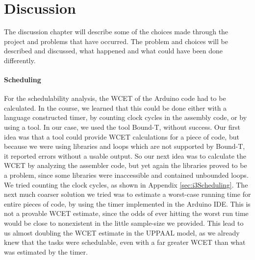 \chapter{Discussion}
\label{chap:Discussion}
The discussion chapter will describe some of the choices made through the project and problems that have occurred. The problem and choices will be described and discussed, what happened and what could have been done differently. 


\subsubsection{Scheduling}
For the schedulability analysis, the WCET of the Arduino code had to be calculated. In the course, we learned that this could be done either with a language constructed timer, by counting clock cycles in the assembly code, or by using a tool. In our case, we used the tool Bound-T, without success. Our first idea was that a tool could provide WCET calculations for a piece of code, but because we were using libraries and loops which are not supported by Bound-T, it reported errors without a usable output. So our next idea was to calculate the WCET by analyzing the assembler code, but yet again the libraries proved to be a problem, since some libraries were inaccessible and contained unbounded loops. We tried counting the clock cycles, as shown in Appendix \ref{sec:i3Scheduling}. The next much coarser solution we tried was to estimate a worst-case running time for entire pieces of code, by using the timer implemented in the Arduino IDE. This is not a provable WCET estimate, since the odds of ever hitting the worst run time would be close to nonexistent in the little sample-size we provided. This lead to us almost doubling the WCET estimate in the UPPAAL model, as we already knew that the tasks were schedulable, even with a far greater WCET than what was estimated by the timer.


